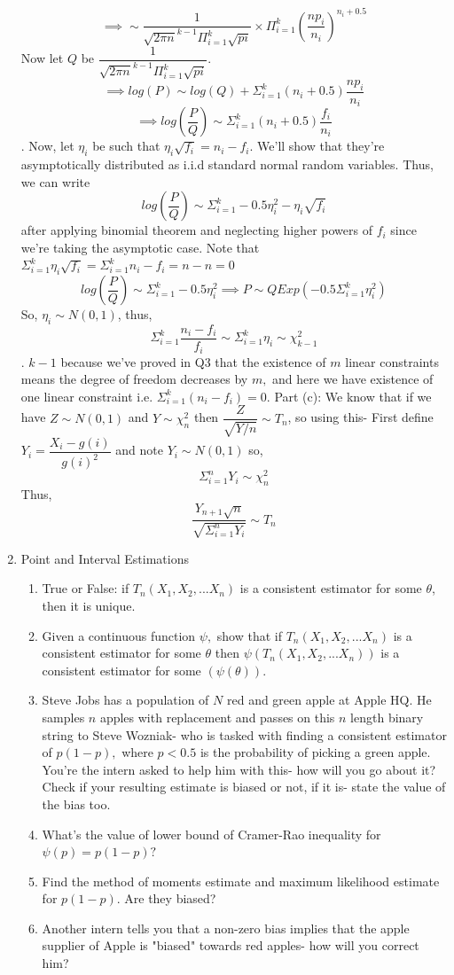 \documentclass[12pt, oneside]{article}
\begin{document}
\begin{enumerate}
$$\implies \sim \dfrac{1}{\sqrt{2\pi n}^{k-1} \Pi_{i=1}^{k} \sqrt{pi}} \times \Pi_{i=1}^{k} (\dfrac{n p_i}{n_i})^{n_i+0.5} 
$$
Now let $Q$ be $\dfrac{1}{\sqrt{2\pi n}^{k-1} \Pi_{i=1}^{k} \sqrt{pi}}$.
$$\implies log(P) \sim log(Q) + \Sigma_{i=1}^{k} (n_i + 0.5)\dfrac{np_i}{n_i} $$
$$\implies log(\dfrac{P}{Q}) \sim \Sigma_{i=1}^{k} (n_i + 0.5)\dfrac{f_i}{n_i}$$. 
Now, let $\eta_i$ be such that $\eta_i \sqrt{f_i} = n_i - f_i$. We'll show that they're asymptotically distributed as i.i.d standard normal random variables. 
Thus, we can write 
$$log(\dfrac{P}{Q}) \sim \Sigma_{i=1}^{k} -0.5 \eta_i^2 - \eta_i \sqrt{f_i}$$ after applying binomial theorem and neglecting higher powers of $f_i$ since we're taking the asymptotic case. Note that $\Sigma_{i=1}^{k} \eta_i \sqrt{f_i} = \Sigma_{i=1}^{k} n_i - f_i = n - n = 0$
$$log(\dfrac{P}{Q}) \sim \Sigma_{i=1}^{k} -0.5 \eta_i^2 \implies P \sim Q Exp(-0.5 \Sigma_{i=1}^{k} \eta_i^2)$$
So, $\eta_i \sim N(0,1)$, thus, 
$$\Sigma_{i=1}^{k} \dfrac{n_i-f_i}{f_i} \sim \Sigma_{i=1}^{k} \eta_i \sim \chi_{k-1}^2$$. $k-1$ because we've proved in Q3 that the existence of $m$ linear constraints means the degree of freedom decreases by $m,$ and here we have existence of one linear constraint i.e. $\Sigma_{i=1}^{k} (n_i - f_i) = 0$. 
\newline Part (c): We know that if we have $Z \sim N(0,1)$ and $Y \sim \chi_{n}^2$ then $\dfrac{Z}{\sqrt{Y/n}} \sim T_n$, so using this-
First define $Y_i = \dfrac{X_i - g(i)}{g(i)^2}$ and note $Y_i \sim N(0,1)$ so, 
$$\Sigma_{i=1}^{n} Y_i \sim \chi_{n}^2$$
Thus, $$\dfrac{Y_{n+1}\sqrt{n}}{\sqrt{\Sigma_{i=1}^{n} Y_i}} \sim T_n$$

\item	Point and Interval Estimations
\begin{enumerate}
    \item True or False: if $T_n(X_1,X_2,...X_n)$ is a consistent estimator for some $\theta$, then it is unique. 
    \item Given a continuous function $\psi,$ show that if $T_n(X_1,X_2,...X_n)$ is a consistent estimator for some $\theta$ then $\psi(T_n(X_1,X_2,...X_n))$ is a consistent estimator for some $(\psi(\theta))$.
    \item Steve Jobs has a population of $N$ red and green apple at Apple HQ. He samples $n$ apples with replacement and passes on this $n$ length binary string to Steve Wozniak- who is tasked with finding a consistent estimator of $p(1-p),$ where $p < 0.5$ is the probability of picking a green apple. You're the intern asked to help him with this- how will you go about it? Check if your resulting estimate is biased or not, if it is- state the value of the bias too.
    \item What's the value of lower bound of Cramer-Rao inequality for $\psi(p) = p(1-p)?$
    \item Find the method of moments estimate and maximum likelihood estimate for $p(1-p)$. Are they biased? 
    \item Another intern tells you that a non-zero bias implies that the apple supplier of Apple is "biased" towards red apples- how will you correct him?  


\end{enumerate}
\end{enumerate}
\end{document}
